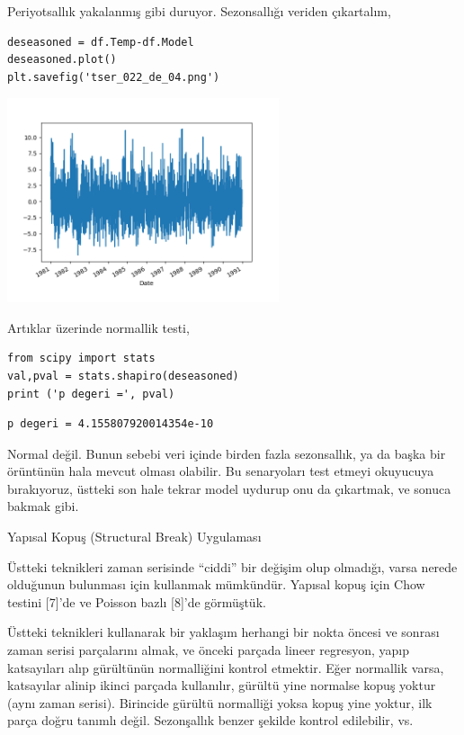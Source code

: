 \documentclass[12pt,fleqn]{article}\usepackage{../../common}
\begin{document}
Periyotsallık yakalanmış gibi duruyor. Sezonsallığı veriden çıkartalım,

\begin{verbatim}
deseasoned = df.Temp-df.Model
deseasoned.plot()
plt.savefig('tser_022_de_04.png')
\end{verbatim}

\includegraphics[height=6cm]{tser_022_de_04.png}

Artıklar üzerinde normallik testi,

\begin{verbatim}
from scipy import stats
val,pval = stats.shapiro(deseasoned)
print ('p degeri =', pval)
\end{verbatim}

\begin{verbatim}
p degeri = 4.155807920014354e-10
\end{verbatim}

Normal değil. Bunun sebebi veri içinde birden fazla sezonsallık, ya da başka bir
örüntünün hala mevcut olması olabilir. Bu senaryoları test etmeyi okuyucuya
bırakıyoruz, üstteki son hale tekrar model uydurup onu da çıkartmak, ve sonuca
bakmak gibi.

Yapısal Kopuş (Structural Break) Uygulaması

Üstteki teknikleri zaman serisinde ``ciddi'' bir değişim olup olmadığı, varsa
nerede olduğunun bulunması için kullanmak mümkündür. Yapısal kopuş için Chow
testini [7]'de ve Poisson bazlı [8]'de görmüştük. 

Üstteki teknikleri kullanarak bir yaklaşım herhangi bir nokta öncesi ve sonrası
zaman serisi parçalarını almak, ve önceki parçada lineer regresyon, yapıp
katsayıları alıp gürültünün normalliğini kontrol etmektir. Eğer normallik varsa,
katsayılar alinip ikinci parçada kullanılır, gürültü yine normalse kopuş yoktur
(aynı zaman serisi). Birincide gürültü normalliği yoksa kopuş yine yoktur, ilk
parça doğru tanımlı değil. Sezonşallık benzer şekilde kontrol edilebilir, vs.
\end{document}
